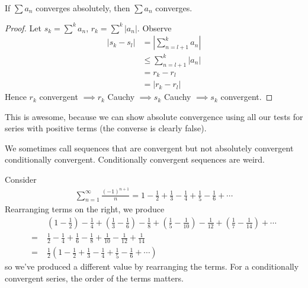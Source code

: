 \documentclass{../../template/note}
\begin{document}
    \begin{lemma}
        If \(\sum a_n\) converges absolutely, then \(\sum a_n\) converges.
    \end{lemma}
    
    \begin{proof}
        Let \(s_k = \sum^k a_n\), \(r_k = \sum^k |a_n|\). Observe
        \begin{align*}
            |s_k - s_l| &= \left|\sum_{n=l+1}^k a_n\right| \\
            &\leq \sum_{n=l+1}^k |a_n| \\
            &= r_k - r_l \\
            &= |r_k - r_l|
        \end{align*}
        Hence \(r_k\) convergent \(\implies r_k\) Cauchy \(\implies s_k\) Cauchy \(\implies s_k\) convergent.        
    \end{proof}
    
    \begin{remark*}
        This is awesome, because we can show absolute convergence using all our tests for series with positive terms (the converse is clearly false).
    \end{remark*}
    
    We sometimes call sequences that are convergent but not absolutely convergent conditionally convergent. Conditionally convergent sequences are weird.

    \begin{example}
        Consider
        \begin{align*}
            \sum_{n=1}^\infty \frac{(-1)^{n+1}}{n} = 1 - \frac 1 2 + \frac 1 3 - \frac 1 4 + \frac 1 5 - \frac 1 6 + \cdots
        \end{align*}
        Rearranging terms on the right, we produce
        \begin{align*}
            &\;\left(1 - \frac 1 2\right) - \frac 1 4 + \left(\frac 1 3 - \frac 1 6\right) - \frac 1 8 + \left(\frac 1 5 - \frac 1 {10}\right) - \frac 1 {12} + \left(\frac 1 7 - \frac 1 {14}\right) + \cdots \\
            =&\; \frac 1 2 - \frac 1 4 + \frac 1 6 - \frac 1 8 + \frac 1 {10} - \frac 1 {12} + \frac 1 {14} \\
            =&\; \frac 1 2 \left(1 - \frac 1 2 + \frac 1 3 - \frac 1 4 + \frac 1 5 - \frac 1 6 + \cdots\right)
        \end{align*}
        so we've produced a different value by rearranging the terms. For a conditionally convergent series, the order of the terms matters.       
    \end{example}
    
\end{document}
